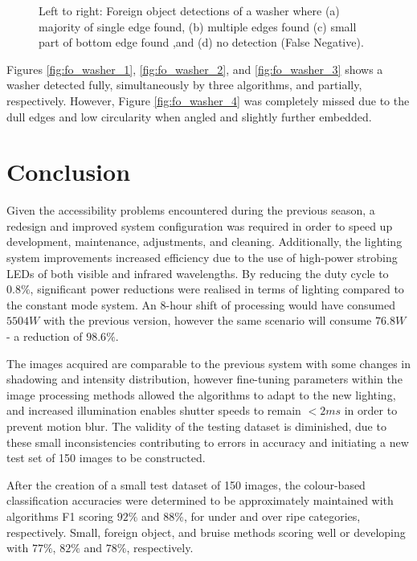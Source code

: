 \documentclass[fleqn,twoside,12pt]{report}
\begin{document}
\begin{figure}[h]
	\caption{Left to right: Foreign object detections of a washer where (a) majority of single edge found, (b) multiple edges found (c) small part of bottom edge found ,and (d) no detection (False Negative).}
	\label{fig:fo_washer}
\end{figure}

Figures \ref{fig:fo_washer_1}, \ref{fig:fo_washer_2}, and \ref{fig:fo_washer_3} shows a washer detected fully, simultaneously by three algorithms, and partially, respectively. However, Figure \ref{fig:fo_washer_4} was completely missed due to the dull edges and low circularity when angled and slightly further embedded.



\section{Conclusion}


Given the accessibility problems encountered during the previous season, a redesign and improved system configuration was required in order to speed up development, maintenance, adjustments, and cleaning. Additionally, the lighting system improvements increased efficiency due to the use of high-power strobing LEDs of both visible and infrared wavelengths. By reducing the duty cycle to $0.8\%$, significant power reductions were realised in terms of lighting compared to the constant mode system. An 8-hour shift of processing would have consumed $5504W$ with the previous version, however the same scenario will consume $76.8W$ - a reduction of $98.6\%$. 


The images acquired are comparable to the previous system with some changes in shadowing and intensity distribution, however fine-tuning parameters within the image processing methods allowed the algorithms to adapt to the new lighting, and increased illumination enables shutter speeds to remain $<2ms$ in order to prevent motion blur. The validity of the testing dataset is diminished, due to these small inconsistencies contributing to errors in accuracy and initiating a new test set of 150 images to be constructed.

After the creation of a small test dataset of 150 images, the colour-based classification accuracies were determined to be approximately maintained with algorithms F1 scoring $92\%$ and $88\%$, for under and over ripe categories, respectively. Small, foreign object, and bruise methods scoring well or developing with $77\%$, $82\%$ and $78\%$, respectively.
\end{document}
